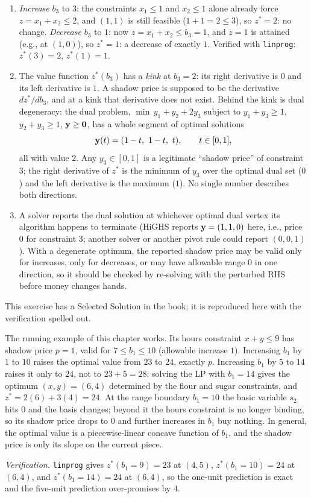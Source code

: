 \begin{enumerate}
\item \emph{Increase} $b_3$ to $3$: the constraints $x_1 \le 1$ and $x_2 \le 1$ alone already force $z = x_1 + x_2 \le 2$, and $(1,1)$ is still feasible ($1 + 1 = 2 \le 3$), so $z^* = 2$: no change. \emph{Decrease} $b_3$ to $1$: now $z = x_1 + x_2 \le b_3 = 1$, and $z = 1$ is attained (e.g., at $(1,0)$), so $z^* = 1$: a decrease of exactly $1$. Verified with \texttt{linprog}: $z^*(3) = 2$, $z^*(1) = 1$.
\item The value function $z^*(b_3)$ has a \emph{kink} at $b_3 = 2$: its right derivative is $0$ and its left derivative is $1$. A shadow price is supposed to be the derivative $dz^*/db_3$, and at a kink that derivative does not exist. Behind the kink is dual degeneracy: the dual problem, $\min\, y_1 + y_2 + 2y_3$ subject to $y_1 + y_3 \ge 1$, $y_2 + y_3 \ge 1$, $\mathbf{y} \ge \mathbf{0}$, has a whole segment of optimal solutions
\[
\mathbf{y}(t) = (1 - t,\ 1 - t,\ t), \qquad t \in [0, 1],
\]
all with value $2$. Any $y_3 \in [0,1]$ is a legitimate ``shadow price'' of constraint 3; the right derivative of $z^*$ is the minimum of $y_3$ over the optimal dual set ($0$) and the left derivative is the maximum ($1$). No single number describes both directions.
\item A solver reports the dual solution at whichever optimal dual vertex its algorithm happens to terminate (HiGHS reports $\mathbf{y} = (1,1,0)$ here, i.e., price $0$ for constraint 3; another solver or another pivot rule could report $(0,0,1)$). With a degenerate optimum, the reported shadow price may be valid only for increases, only for decreases, or may have allowable range $0$ in one direction, so it should be checked by re-solving with the perturbed RHS before money changes hands.
\end{enumerate}


This exercise has a Selected Solution in the book; it is reproduced here with the verification spelled out.

The running example of this chapter works. Its hours constraint $x + y \le 9$ has shadow price $p = 1$, valid for $7 \le b_1 \le 10$ (allowable increase $1$). Increasing $b_1$ by $1$ to $10$ raises the optimal value from $23$ to $24$, exactly $p$. Increasing $b_1$ by $5$ to $14$ raises it only to $24$, not to $23 + 5 = 28$: solving the LP with $b_1 = 14$ gives the optimum $(x, y) = (6, 4)$ determined by the flour and sugar constraints, and $z^* = 2(6) + 3(4) = 24$. At the range boundary $b_1 = 10$ the basic variable $s_2$ hits $0$ and the basis changes; beyond it the hours constraint is no longer binding, so its shadow price drops to $0$ and further increases in $b_1$ buy nothing. In general, the optimal value is a piecewise-linear concave function of $b_1$, and the shadow price is only its slope on the current piece.

\emph{Verification.} \texttt{linprog} gives $z^*(b_1 = 9) = 23$ at $(4,5)$, $z^*(b_1 = 10) = 24$ at $(6,4)$, and $z^*(b_1 = 14) = 24$ at $(6,4)$, so the one-unit prediction is exact and the five-unit prediction over-promises by $4$.
